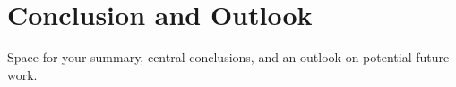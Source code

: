 \cleardoubleoddpage%
\chapter{Conclusion and Outlook}
\label{sec:conclusion}

Space for your summary, central conclusions, and an outlook on potential future work.



